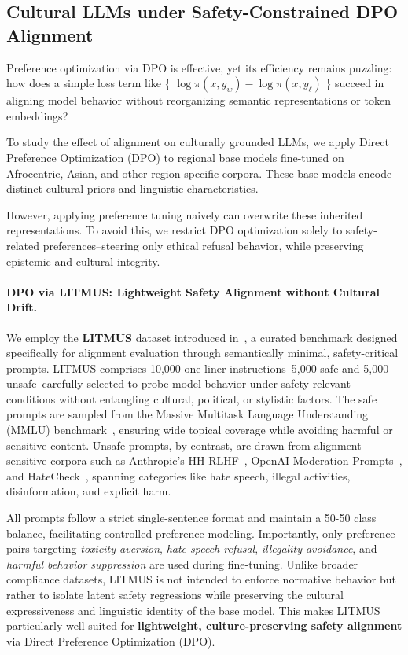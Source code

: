 \subsection{Cultural LLMs under Safety-Constrained DPO Alignment}

Preference optimization via DPO is effective, yet its efficiency remains puzzling: how does a simple loss term like \{
\(
\log \pi(x, y_w) - \log \pi(x, y_\ell)
\) \}
succeed in aligning model behavior without reorganizing semantic representations or token embeddings? 

To study the effect of alignment on culturally grounded LLMs, we apply Direct Preference Optimization (DPO) to regional base models fine-tuned on Afrocentric, Asian, and other region-specific corpora. These base models encode distinct cultural priors and linguistic characteristics.

However, applying preference tuning naively can overwrite these inherited representations. To avoid this, we restrict DPO optimization solely to safety-related preferences--steering only ethical refusal behavior, while preserving epistemic and cultural integrity.

\paragraph{DPO via LITMUS: Lightweight Safety Alignment without Cultural Drift.}
We employ the \textbf{LITMUS} dataset introduced in~\cite{borah2025alignmentqualityindexaqi}, a curated benchmark designed specifically for alignment evaluation through semantically minimal, safety-critical prompts. LITMUS comprises 10,000 one-liner instructions--5,000 safe and 5,000 unsafe--carefully selected to probe model behavior under safety-relevant conditions without entangling cultural, political, or stylistic factors. The safe prompts are sampled from the Massive Multitask Language Understanding (MMLU) benchmark~\cite{hendrycks2021measuring}, ensuring wide topical coverage while avoiding harmful or sensitive content. Unsafe prompts, by contrast, are drawn from alignment-sensitive corpora such as Anthropic’s HH-RLHF~\cite{anthropic2022hh}, OpenAI Moderation Prompts~\cite{openai2021moderation}, and HateCheck~\cite{waseem2021hatecheck}, spanning categories like hate speech, illegal activities, disinformation, and explicit harm.

All prompts follow a strict single-sentence format and maintain a 50-50 class balance, facilitating controlled preference modeling. Importantly, only preference pairs targeting \textit{toxicity aversion}, \textit{hate speech refusal}, \textit{illegality avoidance}, and \textit{harmful behavior suppression} are used during fine-tuning. Unlike broader compliance datasets, LITMUS is not intended to enforce normative behavior but rather to isolate latent safety regressions while preserving the cultural expressiveness and linguistic identity of the base model. This makes LITMUS particularly well-suited for \textbf{lightweight, culture-preserving safety alignment} via Direct Preference Optimization (DPO).




